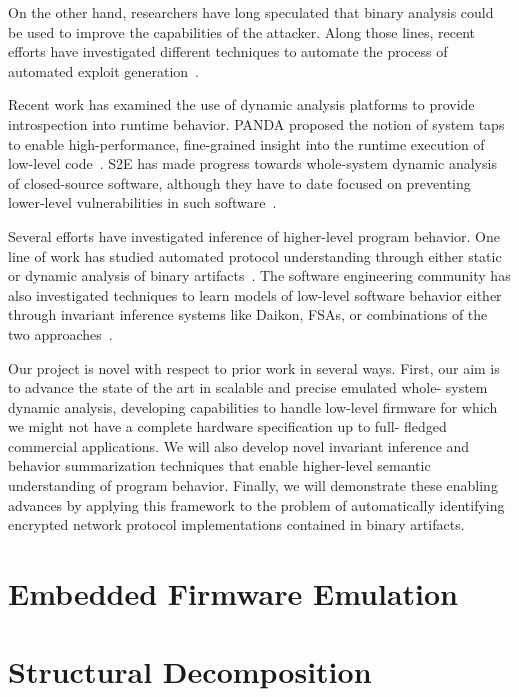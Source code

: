 \documentclass[letterpaper,twoside,11pt,headings=small]{scrartcl}
\begin{document}
On the other hand, researchers have long speculated that binary analysis could
be used to improve the capabilities of the attacker.  Along those lines,
recent efforts have investigated different techniques to automate the
process of automated exploit generation~\cite{avgerinos:ndss2011:aeg,schwartz:sec2011:q,cha:oakland2012:mayhem}.

Recent work has examined the use of dynamic analysis platforms to provide
introspection into runtime behavior.  PANDA proposed the notion of system
taps to enable high-performance, fine-grained insight into the runtime
execution of low-level code~\cite{dolangavitt:2013:tzb}.  S2E has made
progress towards whole-system dynamic analysis of closed-source software,
although they have to date focused on preventing lower-level vulnerabilities
in such software~\cite{chipounov:asplos2011:s2e}.

Several efforts have investigated inference of higher-level program behavior.
One line of work has studied automated protocol understanding through either
static or dynamic analysis of binary
artifacts~\cite{caballero:ccs2007:polyglot,wondracek:ndss2008:protocol}.  The
software engineering community has also investigated techniques to learn
models of low-level software behavior either through invariant inference
systems like Daikon, FSAs, or combinations of the two
approaches~\cite{ernst:2009:daikon,csallner:icse2008:dysy,krka:icsa2010:inference}.

Our project is novel with respect to prior work in several ways.  First, our
aim is to advance the state of the art in scalable and precise emulated whole-
system dynamic analysis, developing capabilities to handle low-level firmware
for which we might not have a complete hardware specification up to full-
fledged commercial applications.  We will also develop novel invariant
inference and behavior summarization techniques that enable higher-level
semantic understanding of program behavior.  Finally, we will demonstrate
these enabling advances by applying this framework to the problem of
automatically identifying encrypted network protocol implementations contained
in binary artifacts.

\section{Embedded Firmware Emulation}
\label{sec:research:firmware}



\section{Structural Decomposition}
\label{sec:research:structure}
\end{document}
